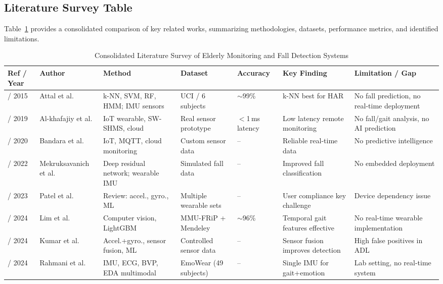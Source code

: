 \documentclass[conference]{IEEEtran}
\begin{document}
\subsection{Literature Survey Table}

Table~\ref{tab:litsurvey} provides a consolidated comparison of key related works, summarizing methodologies, datasets, performance metrics, and identified limitations.

\begin{table}[!t]
\centering
\caption{Consolidated Literature Survey of Elderly Monitoring and Fall Detection Systems}
\label{tab:litsurvey}
\renewcommand{\arraystretch}{1.15}
\begin{tabular}{|p{1.8cm}|p{1.6cm}|p{2.4cm}|p{1.8cm}|p{1.4cm}|p{2.2cm}|p{2.4cm}|}
\hline
\textbf{Ref / Year} & \textbf{Author} & \textbf{Method} & \textbf{Dataset} & \textbf{Accuracy} & \textbf{Key Finding} & \textbf{Limitation / Gap} \\
\hline
\cite{attal2015} / 2015 & Attal et al. & k-NN, SVM, RF, HMM; IMU sensors & UCI / 6 subjects & $\sim$99\% & k-NN best for HAR & No fall prediction, no real-time deployment \\
\hline
\cite{alkhafajiy2019} / 2019 & Al-khafajiy et al. & IoT wearable, SW-SHMS, cloud & Real sensor prototype & $<$1\,ms latency & Low latency remote monitoring & No fall/gait analysis, no AI prediction \\
\hline
\cite{bandara2020} / 2020 & Bandara et al. & IoT, MQTT, cloud monitoring & Custom sensor data & -- & Reliable real-time data & No predictive intelligence \\
\hline
\cite{mekruksavanich2022} / 2022 & Mekruksavanich et al. & Deep residual network; wearable IMU & Simulated fall data & -- & Improved fall classification & No embedded deployment \\
\hline
\cite{patel2023} / 2023 & Patel et al. & Review: accel., gyro., ML & Multiple wearable sets & -- & User compliance key challenge & Device dependency issue \\
\hline
\cite{lim2024} / 2024 & Lim et al. & Computer vision, LightGBM & MMU-FRiP + Mendeley & $\sim$96\% & Temporal gait features effective & No real-time wearable implementation \\
\hline
\cite{kumar2024} / 2024 & Kumar et al. & Accel.+gyro., sensor fusion, ML & Controlled sensor data & -- & Sensor fusion improves detection & High false positives in ADL \\
\hline
\cite{rahmani2024} / 2024 & Rahmani et al. & IMU, ECG, BVP, EDA multimodal & EmoWear (49 subjects) & -- & Single IMU for gait+emotion & Lab setting, no real-time system \\

\end{tabular}
\end{table}
\end{document}
